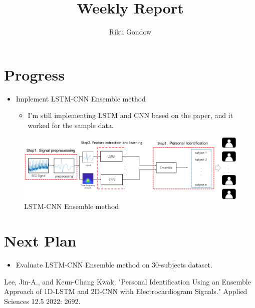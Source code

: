 \documentclass[dvipdfmx]{article}
\begin{document}
\title{Weekly Report}
\author{Riku Gondow}
\maketitle

\section{Progress}
\begin{itemize}
    \item Implement LSTM-CNN Ensemble method\cite{lstm}
    \begin{itemize}
        \item I'm still implementing LSTM and CNN based on the paper, and it worked for the sample data.
    \end{itemize}
\end{itemize}

\begin{figure}[H]
\begin{center}
\includegraphics[width=\linewidth]{./img/LSTM-CNN.png}
\end{center}
\caption{LSTM-CNN Ensemble method}
\end{figure}

\section{Next Plan}
\begin{itemize}
    \item Evaluate LSTM-CNN Ensemble method on 30-subjects dataset.
\end{itemize}

\begin{thebibliography}{99}
 Lee, Jin-A., and Keun-Chang Kwak. "Personal Identification Using an Ensemble Approach of 1D-LSTM and 2D-CNN with Electrocardiogram Signals." Applied Sciences 12.5 2022: 2692.
\end{thebibliography}
\end{document}
